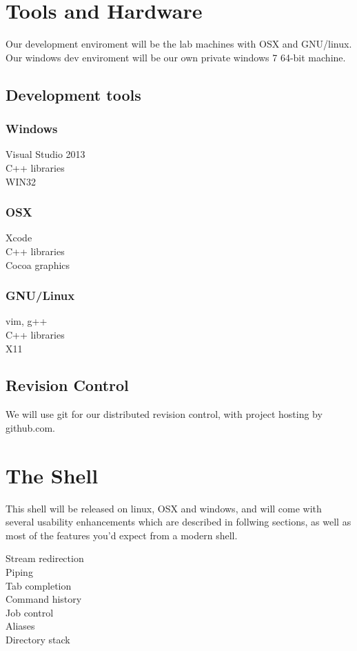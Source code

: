 \documentclass[a4paper,12pt]{article}
\begin{document}
\pagebreak
\section*{Tools and Hardware}

Our development enviroment will be the lab machines with OSX and GNU/linux.
Our windows dev enviroment will be our own private windows 7 64-bit machine.
\subsection*{Development tools}
\begin{multicols}{3}
  \subsubsection*{Windows}
    Visual Studio 2013 \\
    C++ libraries \\
    WIN32 \columnbreak
  \subsubsection*{OSX}
    Xcode \\
    C++ libraries \\
    Cocoa graphics \columnbreak
  \subsubsection*{GNU/Linux}
    vim, g++ \\
    C++ libraries \\
    X11
\end{multicols}
\subsection*{Revision Control}
We will use git for our distributed revision control, with project hosting by github.com.
\section*{The Shell}
This shell will be released on linux, OSX and windows, and will come with several usability enhancements which are described in follwing sections, as well as most of the features you'd expect from a modern shell.
\begin{multicols}{4}
\noindent
Stream redirection \\
Piping \\
Tab completion \\
Command history \\
Job control \\
Aliases \\
Directory stack
\end{multicols}
\end{document}
